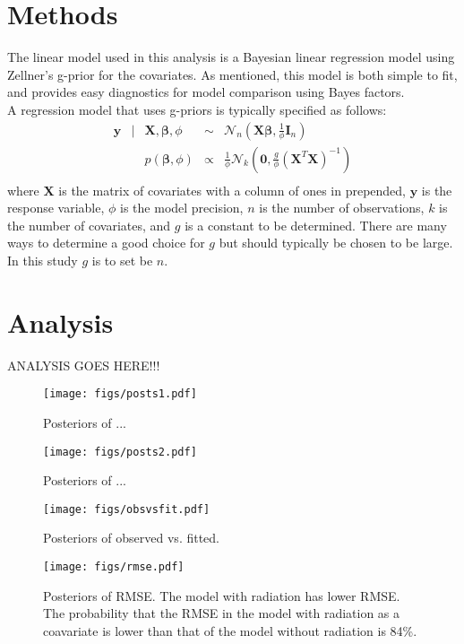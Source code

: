 \documentclass{../../tex_template/asaproc}
\newcommand{\p}[1]{\left(#1\right)}
\newcommand{\y}{\bm y}
\newcommand{\X}{\bm X}
\newcommand{\Xb}{\bm {X\beta}}
\begin{document}
\section{Methods}
The linear model used in this analysis is a Bayesian linear regression model
using Zellner's g-prior for the covariates. As mentioned, this model is both
simple to fit, and provides easy diagnostics for model comparison using 
Bayes factors.\\

A regression model that uses g-priors is typically specified as follows:
\[
  \begin{array}{rclcl}
    \y &|& \X,\bm\beta,\phi &\sim& \mathcal{N}_n\p{\Xb,\frac{1}{\phi}\bm I_n} \\
       && p(\bm\beta,\phi) &\propto& \frac{1}{\phi} \mathcal{N}_k (\bm 0, \frac{g}{\phi} (\X^T\X)^{-1})\\
  \end{array}
\]
where $\X$ is the matrix of covariates with a column of ones in prepended, $\y$
is the response variable, $\phi$ is the model precision, $n$ is the number of
observations, $k$ is the number of covariates, and $g$ is a constant to be
determined. There are many ways to determine a good choice for $g$ but should
typically be chosen to be large. In this study $g$ is to set be $n$. 

\section{Analysis}
ANALYSIS GOES HERE!!!
\begin{figure}[H]
  \texttt{[image: figs/posts1.pdf]}
  \caption{\small Posteriors of ... }
  \label{fig:posts1}
\end{figure}

\begin{figure}[H]
  \texttt{[image: figs/posts2.pdf]}
  \caption{\small Posteriors of ... }
  \label{fig:posts2}
\end{figure}

\begin{figure}[H]
  \texttt{[image: figs/obsvsfit.pdf]}
  \caption{\small Posteriors of observed vs. fitted. }
  \label{fig:obsvsfit}
\end{figure}

\begin{figure}[H]
  \texttt{[image: figs/rmse.pdf]}
  \caption{\small Posteriors of RMSE. The model with radiation has lower RMSE.
    The probability that the RMSE in the model with radiation as a coavariate
    is lower than that of the model without radiation is 84\%.}
  \label{fig:rmse}
\end{figure}
\end{document}
